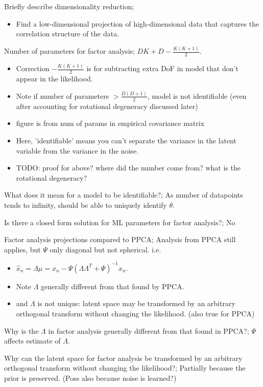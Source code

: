 \documentclass{article}
\begin{document}
Briefly describe dimensionality reduction; \begin{itemize} \item Find a low-dimensional projection of high-dimensional data that captures the correlation structure of the data.  \end{itemize}

Number of parameters for factor analysis; $DK + D - \frac{K(K+1)}{2}$. \begin{itemize} \item Correction $- \frac{K(K+1)}{2}$ is for subtracting extra DoF in model that don't appear in the likelihood.  \item Note if number of parameters $> \frac{D(D+1)}{2}$, model is not identifiable (even after accounting for rotational degeneracy discussed later) \item figure is from num of params in empirical covariance matrix \item Here, 'identifiable' means you can't separate the variance in the latent variable from the variance in the noise.  \item TODO: proof for above? where did the number come from? what is the rotational degeneracy?  \end{itemize}

What does it mean for a model to be identifiable?; As number of datapoints tends to infinity, should be able to uniquely identify $\theta$.

Is there a closed form solution for ML parameters for factor analysis?; No

Factor analysis projections compared to PPCA; Analysis from PPCA still applies, but $\Psi$ only diagonal but not spherical. i.e. \begin{itemize} \item $\hat{x}_n=\Lambda\mu=x_n - \Psi(\Lambda\Lambda^T+\Psi)^{-1}x_n$.  \item Note $\Lambda$ generally different from that found by PPCA.  \item and $\Lambda$ is not unique: latent space may be transformed by an arbitrary orthogonal transform without changing the likelihood. (also true for PPCA) \end{itemize}

Why is the $\Lambda$ in factor analysis generally different from that found in PPCA?; $\Psi$ affects estimate of $\Lambda$.

Why can the latent space for factor analysis be transformed by an arbitrary orthogonal transform without changing the likelihood?; Partially because the prior is preserved. (Poss also because noise is learned?)
\end{document}
